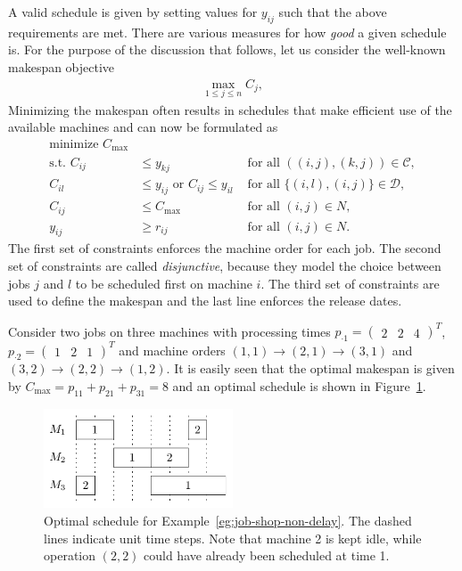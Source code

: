 \documentclass{article}
\theoremstyle{definition}
\theoremstyle{plain}
\begin{document}
A valid schedule is given by setting values for $y_{ij}$ such that the above
requirements are met. There are various measures for how \textit{good} a given
schedule is. For the purpose of the discussion that follows, let us consider the
well-known makespan objective
\begin{align}
\max_{1 \leq j \leq n} C_{j},
\end{align}
Minimizing the makespan often results in schedules that make efficient use of
the available machines and can now be formulated as
%
\begin{subequations}
  \label{eq:job-shop-natural}
\begin{align}
  \text{minimize } C_{\text{max}} \\
  \text{s.t. } C_{ij} &\leq y_{kj}  & \text{ for all } ((i,j), (k,j)) \in \mathcal{C}, \\
  C_{il} &\leq  y_{ij} \text{ or } C_{ij} \leq y_{il}  & \text{ for all } \{(i,l), (i,j)\} \in \mathcal{D}, \label{eq:disjunctive-constraints} \\
  C_{ij} &\leq C_{\text{max}} & \text{ for all } (i,j) \in N, \\
  y_{ij} &\geq r_{ij} & \text{ for all } (i,j) \in N.
\end{align}
\end{subequations}
%
The first set of constraints enforces the machine order for each job. The second
set of constraints are called \textit{disjunctive}, because they model the
choice between jobs $j$ and $l$ to be scheduled first on machine $i$. The third
set of constraints are used to define the makespan and the last line enforces
the release dates.

\begin{eg}
  \label{eg:job-shop-non-delay}
  Consider two jobs on three machines with processing times
  $p_{\cdot 1} = \begin{pmatrix} 2 & 2 & 4 \end{pmatrix}^T$,
  $p_{\cdot 2} = \begin{pmatrix} 1 & 2 & 1 \end{pmatrix}^T$ and machine orders
  $(1,1) \rightarrow (2,1) \rightarrow (3,1)$ and
  $(3,2) \rightarrow (2,2) \rightarrow (1,2)$. It is easily seen that the
  optimal makespan is given by $C_\text{max} = p_{11} + p_{21} + p_{31} = 8$ and
  an optimal schedule is shown in Figure~\ref{fig:job-shop-delay}.
\end{eg}

\begin{figure}
  \centering
  \includegraphics[width=0.5\textwidth]{figures/job-shop-delay.pdf}
  \caption{Optimal schedule for Example~\ref{eg:job-shop-non-delay}. The dashed
    lines indicate unit time steps. Note that machine 2 is kept idle, while operation
    $(2,2)$ could have already been scheduled at time 1.}
  \label{fig:job-shop-delay}
\end{figure}
\end{document}

